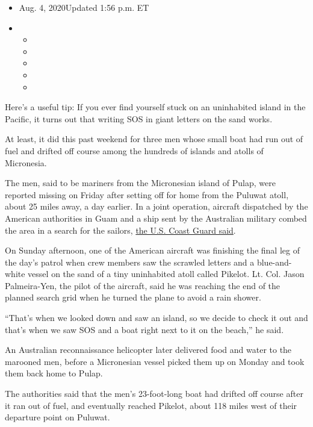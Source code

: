 \begin{itemize}
\item
  Aug. 4, 2020Updated 1:56 p.m. ET
\item
  \begin{itemize}
  \item
  \item
  \item
  \item
  \item
  \end{itemize}
\end{itemize}

Here's a useful tip: If you ever find yourself stuck on an uninhabited
island in the Pacific, it turns out that writing SOS in giant letters on
the sand works.

At least, it did this past weekend for three men whose small boat had
run out of fuel and drifted off course among the hundreds of islands and
atolls of Micronesia.

The men, said to be mariners from the Micronesian island of Pulap, were
reported missing on Friday after setting off for home from the Puluwat
atoll, about 25 miles away, a day earlier. In a joint operation,
aircraft dispatched by the American authorities in Guam and a ship sent
by the Australian military combed the area in a search for the sailors,
\href{https://www.dvidshub.net/news/375188/coast-guard-partners-rescue-three-stranded-mariners-island-federated-states-micronesia}{the
U.S. Coast Guard said}.

On Sunday afternoon, one of the American aircraft was finishing the
final leg of the day's patrol when crew members saw the scrawled letters
and a blue-and-white vessel on the sand of a tiny uninhabited atoll
called Pikelot. Lt. Col. Jason Palmeira-Yen, the pilot of the aircraft,
said he was reaching the end of the planned search grid when he turned
the plane to avoid a rain shower.

``That's when we looked down and saw an island, so we decide to check it
out and that's when we saw SOS and a boat right next to it on the
beach,'' he said.

An Australian reconnaissance helicopter later delivered food and water
to the marooned men, before a Micronesian vessel picked them up on
Monday and took them back home to Pulap.

The authorities said that the men's 23-foot-long boat had drifted off
course after it ran out of fuel, and eventually reached Pikelot, about
118 miles west of their departure point on Puluwat.


